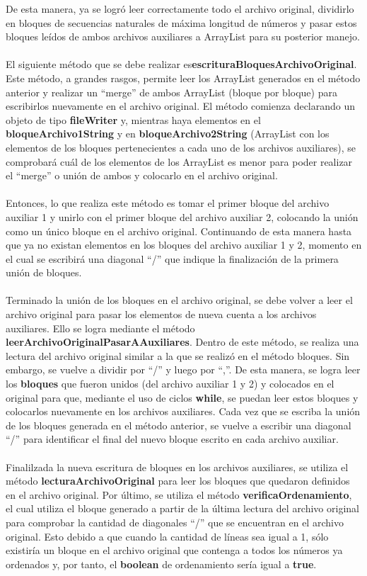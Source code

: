 \documentclass[12pt,letterpaper]{report}
\begin{document}
De esta manera, ya se logró leer correctamente todo el archivo original, dividirlo en bloques de secuencias naturales de máxima longitud de números y pasar estos bloques leídos de ambos archivos auxiliares a ArrayList para su posterior manejo.\\\\ El siguiente método que se debe realizar es\textbf{escrituraBloquesArchivoOriginal}. Este método, a grandes rasgos, permite leer los ArrayList generados en el método anterior y realizar un “merge” de ambos ArrayList (bloque por bloque) para escribirlos nuevamente en el archivo original. El método comienza declarando un objeto de tipo \textbf{fileWriter} y, mientras haya elementos en el \textbf{bloqueArchivo1String} y en \textbf{bloqueArchivo2String} (ArrayList con los elementos de los bloques pertenecientes a cada uno de los archivos auxiliares), se comprobará cuál de los elementos de los ArrayList es menor para poder realizar el “merge” o unión de ambos y colocarlo en el archivo original.\\\\ Entonces, lo que realiza este método es tomar el primer bloque del archivo auxiliar 1 y unirlo con el primer bloque del archivo auxiliar 2, colocando la unión como un único bloque en el archivo original. Continuando de esta manera hasta que ya no existan elementos en los bloques del archivo auxiliar 1 y 2, momento en el cual se escribirá una diagonal “/” que indique la finalización de la primera unión de bloques.\\\\ Terminado la unión de los bloques en el archivo original, se debe volver a leer el archivo original para pasar los elementos de nueva cuenta a los archivos auxiliares. Ello se logra mediante el método \textbf{leerArchivoOriginalPasarAAuxiliares}. Dentro de este método, se realiza una lectura del archivo original similar a la que se realizó en el método bloques. Sin embargo, se vuelve a dividir por “/” y luego por “,”. De esta manera, se logra leer los \textbf{bloques} que fueron unidos (del archivo auxiliar 1 y 2) y colocados en el original para que, mediante el uso de ciclos \textbf{while}, se puedan leer estos bloques y colocarlos nuevamente en los archivos auxiliares. Cada vez que se escriba la unión de los bloques generada en el método anterior, se vuelve a escribir una diagonal “/” para identificar el final del nuevo bloque escrito en cada archivo auxiliar.\\\\ Finalilzada la nueva escritura de bloques en los archivos auxiliares, se utiliza el método \textbf{lecturaArchivoOriginal} para leer los bloques que quedaron definidos en el archivo original. Por último, se utiliza el método \textbf{verificaOrdenamiento}, el cual utiliza el bloque generado a partir de la última lectura del archivo original para comprobar la cantidad de diagonales “/” que se encuentran en el archivo original. Esto debido a que cuando la cantidad de líneas sea igual a 1, sólo existiría un bloque en el archivo original que contenga a todos los números ya ordenados y, por tanto, el \textbf{boolean} de ordenamiento sería igual a \textbf{true}.\\\\
\end{document}
